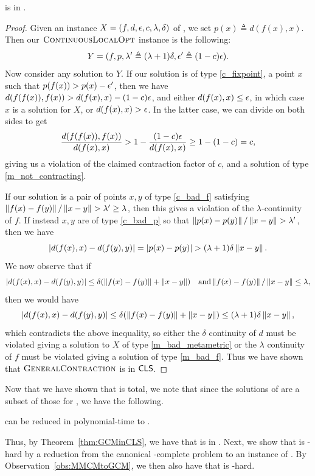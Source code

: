 \begin{theorem}
\label{thm:GCMinCLS}
  \GCM is in \CLS.
\end{theorem}
\begin{proof}
  Given an instance $X=(f,d,\epsilon,c,\lambda,\delta)$ of \GCM, we set $p(x) \triangleq d(f(x),x)$. Then our $\textsc{ContinuousLocalOpt}$ instance is the following:
  \[Y=(f, p, \lambda' \triangleq (\lambda + 1) \delta, \epsilon' \triangleq (1-c)\epsilon).\]
%
Now consider any solution to $Y$. If our solution is of type \ref{c_fixpoint}, a
	point $x$ such that $p(f(x)) > p(x) - \epsilon'$, then we have $d(f(f(x)),f(x))
	> d(f(x),x) - (1-c)\epsilon$, and either $d(f(x),x) \leq \epsilon$, in which case $x$ is
	a solution for $X$, or $d(f(x),x) > \epsilon$. In the latter case, we can divide
	on both sides to get \[ \frac{d(f(f(x)),f(x))}{d(f(x),x)} > 1-
	\frac{(1-c)\epsilon}{d(f(x),x)} \geq 1- (1-c) = c\text{,} \] giving us a violation
	of the claimed contraction factor of $c$, and a solution of type
	\ref{m_not_contracting}.

If our solution is a pair of points $x,y$ of type \ref{c_bad_f} satisfying $\left\| f(x) - f(y) \right\|/\left\| x-y \right\| > \lambda' \geq \lambda$, then this gives a violation of the $\lambda$-continuity of $f$. If instead $x,y$ are of type \ref{c_bad_p} so that $\left\| p(x) - p(y) \right\|/\left\| x-y \right\| > \lambda'$, then we have
\[ \left| d(f(x),x) - d(f(y),y) \right| = \left| p(x) - p(y) \right| > (\lambda+1)\delta \left\| x-y \right\|\text{.} \]
%  
We now observe that if
\[ \left| d(f(x),x) - d(f(y),y) \right| \leq \delta (\left\| f(x)-f(y) \right\| + \left\| x - y \right\|) \quad \text{and} \left\| f(x) - f(y) \right\|/\left\| x-y \right\| \leq \lambda,\] 
	then we would have
\[\left| d(f(x),x) - d(f(y),y) \right| \leq \delta (\left\| f(x) - f(y) \right\| + \left\| x-y \right\|) \leq (\lambda + 1)\delta \left\| x-y \right\|,\] 
which contradicts the above inequality, so either the $\delta$ continuity of $d$ must be violated giving a solution to $X$ of type \ref{m_bad_metametric} or the $\lambda$ continuity of $f$ must be violated giving a solution of type \ref{m_bad_f}.
%
Thus we have shown that $\textsc{GeneralContraction}$ is in $\mathsf{CLS}$.
\end{proof}

Now that we have shown that \GCM is total, we note 
that since the solutions of \GCM are a subset of those for \MMCM, we have the following.

\begin{observation}
\label{obs:MMCMtoGCM}
\MMCM can be reduced in polynomial-time to \GCM.
\end{observation}

Thus, by Theorem~\ref{thm:GCMinCLS}, we have that \MMCM is in \CLS.
%
Next, we show that \MMCM is \CLS-hard by a reduction 
from the canonical \CLS-complete problem \CLO to an instance of \MMCM.
By Observation~\ref{obs:MMCMtoGCM}, we then also have that \GCM is \CLS-hard.

